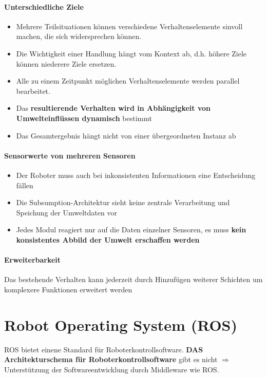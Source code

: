 \paragraph{Unterschiedliche Ziele}
\begin{itemize}
	\item Mehrere Teilsituationen können verschiedene Verhaltenselemente sinvoll
		machen, die sich widersprechen können.
	\item Die Wichtigkeit einer Handlung hängt vom Kontext ab, d.h. höhere Ziele
		können niederere Ziele ersetzen.
	\item Alle zu einem Zeitpunkt möglichen Verhaltenselemente werden parallel
		bearbeitet.
	\item Das \textbf{resultierende Verhalten wird in Abhängigkeit von
		Umwelteinflüssen dynamisch} bestimmt
	\item Das Gesamtergebnis hängt nicht von einer übergeordneten Instanz ab
\end{itemize}

\paragraph{Sensorwerte von mehreren Sensoren}
\begin{itemize}
	\item Der Roboter muss auch bei inkonsistenten Informationen eine
		Entscheidung fällen
	\item Die Subsumption-Architektur sieht keine zentrale Verarbeitung und
		Speichung der Umweltdaten vor
	\item Jedes Modul reagiert nur auf die Daten einzelner Sensoren, es muss
		\textbf{kein konsistentes Abbild der Umwelt erschaffen werden}
\end{itemize}

\paragraph{Erweiterbarkeit} Das bestehende Verhalten kann jederzeit durch
Hinzufügen weiterer Schichten um komplexere Funktionen erweitert werden

\section{Robot Operating System (ROS)}
ROS bietet einene Standard für Roboterkontrollsoftware. \textbf{DAS
Architekturschema für Roboterkontrollsoftware} gibt es nicht $\Rightarrow$
Unterstützung der Softwareentwicklung durch Middleware wie ROS.

